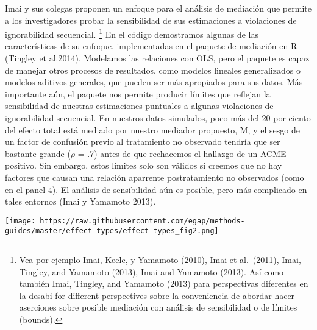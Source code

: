 \documentclass[
]{article}
\begin{document}
Imai y sus colegas proponen un enfoque para el análisis de mediación que
permite a los investigadores probar la sensibilidad de sus estimaciones
a violaciones de ignorabilidad secuencial. \footnote{Vea por ejemplo
  Imai, Keele, y Yamamoto (2010), Imai et al.~(2011), Imai, Tingley, and
  Yamamoto (2013), Imai and Yamamoto (2013). Así como también Imai,
  Tingley, and Yamamoto (2013) para perspectivas diferentes en la desabi
  for different perspectives sobre la conveniencia de abordar hacer
  aserciones sobre posible mediación con análisis de sensibilidad o de
  límites (bounds).} En el código demostramos algunas de las
características de su enfoque, implementadas en el paquete de mediación
en R (Tingley et al.2014). Modelamos las relaciones con OLS, pero el
paquete es capaz de manejar otros procesos de resultados, como modelos
lineales generalizados o modelos aditivos generales, que pueden ser más
apropiados para sus datos. Más importante aún, el paquete nos permite
producir límites que reflejan la sensibilidad de nuestras estimaciones
puntuales a algunas violaciones de ignorabilidad secuencial. En nuestros
datos simulados, poco más del 20 por ciento del efecto total está
mediado por nuestro mediador propuesto, M, y el sesgo de un factor de
confusión previo al tratamiento no observado tendría que ser bastante
grande (\(\rho\) = .7) antes de que rechacemos el hallazgo de un ACME
positivo. Sin embargo, estos límites solo son válidos si creemos que no
hay factores que causan una relación aparrente postratamiento no
observados (como en el panel 4). El análisis de sensibilidad aún es
posible, pero más complicado en tales entornos (Imai y Yamamoto 2013).

\texttt{[image: https://raw.githubusercontent.com/egap/methods-guides/master/effect-types/effect-types\_fig2.png]}
\end{document}
